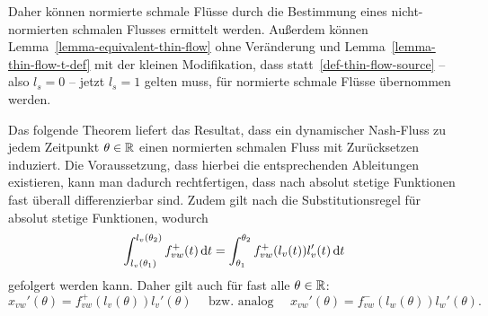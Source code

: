 Daher können normierte schmale Flüsse durch die Bestimmung eines nicht-normierten schmalen Flusses ermittelt werden.
Außerdem können Lemma~\ref{lemma-equivalent-thin-flow} ohne Veränderung und Lemma~\ref{lemma-thin-flow-t-def} mit der kleinen Modifikation, dass statt~\ref{def-thin-flow-source} -- also $l_s = 0$ -- jetzt $l_s = 1$ gelten muss, für normierte schmale Flüsse übernommen werden.

Das folgende Theorem liefert das Resultat, dass ein dynamischer Nash-Fluss zu jedem Zeitpunkt $\theta\in\mathbb{R}$ einen normierten schmalen Fluss mit Zurücksetzen induziert.
Die Voraussetzung, dass hierbei die entsprechenden Ableitungen existieren, kann man dadurch rechtfertigen, dass nach \cite[Folgerung~4.12~b)]{Elstrodt2011Abs} absolut stetige Funktionen fast überall differenzierbar sind.
Zudem gilt nach \cite[Aufgabe~4.10]{Elstrodt2011Abs} die Substitutionsregel für absolut stetige Funktionen, wodurch
\[ 
\int_{l_v(\theta_1)}^{l_v(\theta_2)} f_{vw}^+(t) \mathop{}\!\mathrm{d} t = \int_{\theta_1}^{\theta_2} f_{vw}^+(l_v(t)) l_v'(t) \mathop{}\!\mathrm{d} t
\]
gefolgert werden kann.
Daher gilt auch für fast alle $\theta\in\mathbb{R}$:
\[ 
x_{vw}'(\theta) = f_{vw}^+(l_v(\theta))l_v'(\theta) \text{~~~ bzw. analog ~~~} x_{vw}'(\theta) = f_{vw}^-(l_w(\theta)) l_w'(\theta).
\]

